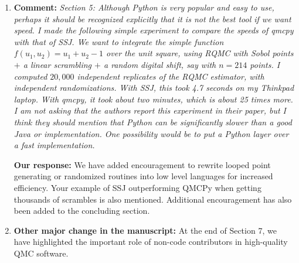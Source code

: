 \documentclass{article}[12pt]
\begin{document}
\begin{enumerate}
    \item \textbf{Comment:} \textit{Section 5: Although Python is very popular and easy to use, perhaps it should be
recognized explicitly that it is not the best tool if we want speed. I made the following
simple experiment to compare the speeds of qmcpy with that of SSJ. We want to
integrate the simple function $f(u_1, u_2) = u_1 + u_2 - 1$ over the unit square, using
RQMC with Sobol points $+$ a linear scrambling $+$ a random digital shift, say with
$n = 214$ points. I computed $20,000$ independent replicates of the RQMC estimator,
with independent randomizations. With SSJ, this took 4.7 seconds on my Thinkpad
laptop. With qmcpy, it took about two minutes, which is about 25 times more. I
am not asking that the authors report this experiment in their paper, but I think
they should mention that Python can be significantly slower than a good Java or
 implementation. One possibility would be to put a Python layer over a fast implementation.
}
    
    	    \textbf{Our response:} We have added encouragement to rewrite looped point generating or randomized routines into low level languages for increased efficiency. Your example of SSJ outperforming QMCPy when getting thousands of scrambles is also mentioned. Additional encouragement has also been added to the concluding section. 
    
    \item  \textbf{Other major change in the manuscript:}
    At the end of Section 7, we have highlighted the important role of non-code contributors in high-quality QMC software.
    
\end{enumerate}
\end{document}
